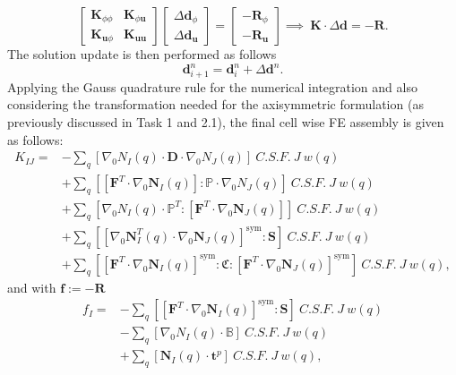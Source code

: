 \begin{equation}
\begin{bmatrix}
\mathbf{K}_{\phi \phi} & \mathbf{K}_{\phi \mathbf{u}} \\
\mathbf{K}_{\mathbf{u} \phi} & \mathbf{K}_{\mathbf{u} \mathbf{u}}
\end{bmatrix}
\begin{bmatrix}
\Delta \mathbf{d}_{\phi} \\
\Delta \mathbf{d}_{\mathbf{u}}
\end{bmatrix}
=
\begin{bmatrix}
-\mathbf{R}_{\phi} \\
-\mathbf{R}_{\mathbf{u}}
\end{bmatrix}
\implies \ \mathbf{K} \cdot \Delta \mathbf{d} = -\mathbf{R}.
\label{eq:3.10}
\end{equation}
The solution update is then performed as follows
\begin{equation}
\mathbf{d}_{i+1}^n = \mathbf{d}_i^n + \Delta \mathbf{d}^n.
\label{eq:3.38}
\end{equation}
Applying the Gauss quadrature rule for the numerical integration and also considering the transformation needed for the axisymmetric formulation (as previously discussed in Task 1 and 2.1), the final cell wise FE assembly is given as follows:
\begin{align}
K_{IJ} = &- \sum\limits_q \left[ \nabla_0 N_I (q) \cdot \mathbf{D} \cdot \nabla_0 N_J (q) \right] \ C.S.F. \ J \ w(q) \nonumber \\
&+ \sum\limits_q \left[ \left[ \mathbf{F}^T \cdot \nabla_0 \mathbf{N}_I (q) \right] : \mathbb{P} \cdot \nabla_0 N_J (q) \right] \ C.S.F. \ J \ w(q) \nonumber \\
&+ \sum\limits_q \left[ \nabla_0 N_I (q) \cdot \mathbb{P}^T : \left[ \mathbf{F}^T \cdot \nabla_0 \mathbf{N}_J (q) \right] \right] \ C.S.F. \ J \ w(q) \nonumber \\
&+ \sum\limits_q \left[ \left[ \nabla_0 \mathbf{N}_I^T (q) \cdot \nabla_0 \mathbf{N}_J (q) \right]^{\text{sym}} : \mathbf{S} \right]  \ C.S.F. \ J \ w(q) \nonumber \\
&+ \sum\limits_q \left[ \left[ \mathbf{F}^T \cdot \nabla_0 \mathbf{N}_I (q) \right]^{\text{sym}} : \mathfrak{C} : \left[ \mathbf{F}^T \cdot \nabla_0 \mathbf{N}_J (q) \right]^{\text{sym}} \right] \ C.S.F. \ J \ w(q),
\label{eq:3.39}
\end{align}
and with $\mathbf{f} := -\mathbf{R}$
\begin{align}
f_I = &- \sum\limits_q \left[ \left[ \mathbf{F}^T \cdot \nabla_0 \mathbf{N}_I (q) \right]^{\text{sym}} : \mathbf{S} \right] \ C.S.F. \ J \ w(q) \nonumber \\
&- \sum\limits_q \left[ \nabla_0 N_I (q) \cdot \mathbb{B} \right] \ C.S.F. \ J \ w(q) \nonumber \\
&+ \sum\limits_q \left[ \mathbf{N}_I (q) \cdot \mathbf{t}^p \right] \ C.S.F. \ J \ w(q),
\label{eq:3.40}
\end{align}
